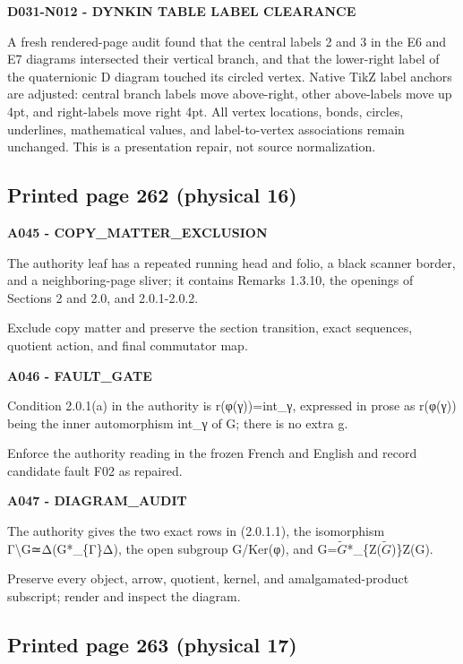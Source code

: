 \documentclass[10pt,a4paper]{article}
\begin{document}
\textbf{D031-N012 - DYNKIN TABLE LABEL CLEARANCE}

A fresh rendered-page audit found that the central labels 2 and 3 in the E6 and E7 diagrams intersected their vertical branch, and that the lower-right label of the quaternionic D diagram touched its circled vertex. Native TikZ label anchors are adjusted: central branch labels move above-right, other above-labels move up 4pt, and right-labels move right 4pt. All vertex locations, bonds, circles, underlines, mathematical values, and label-to-vertex associations remain unchanged. This is a presentation repair, not source normalization.

\subsection{Printed page 262 (physical 16)}

\textbf{A045 - COPY\_MATTER\_EXCLUSION}

The authority leaf has a repeated running head and folio, a black scanner border, and a neighboring-page sliver; it contains Remarks 1.3.10, the openings of Sections 2 and 2.0, and 2.0.1-2.0.2.

Exclude copy matter and preserve the section transition, exact sequences, quotient action, and final commutator map.

\textbf{A046 - FAULT\_GATE}

Condition 2.0.1(a) in the authority is r(φ(γ))=int\_γ, expressed in prose as r(φ(γ)) being the inner automorphism int\_γ of G; there is no extra g.

Enforce the authority reading in the frozen French and English and record candidate fault F02 as repaired.

\textbf{A047 - DIAGRAM\_AUDIT}

The authority gives the two exact rows in (2.0.1.1), the isomorphism Γ\textbackslash G≃Δ(G*\_\{Γ\}Δ), the open subgroup G/Ker(φ), and G=\(\widetilde{G}\)*\_\{Z(\(\widetilde{G}\))\}Z(G).

Preserve every object, arrow, quotient, kernel, and amalgamated-product subscript; render and inspect the diagram.

\subsection{Printed page 263 (physical 17)}
\end{document}

